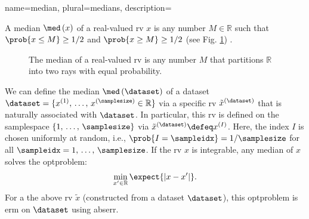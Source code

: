 {name={median}, 
plural={medians},
	description={A median $\med\,(x)$ of a real-valued \gls{rv} $x$ 
 		is any number $M \in \mathbb{R}$ such that $\prob{ x \leq M} \geq 1/2$ and 
		$\prob{ x \geq M} \geq 1/2$ 
		(see Fig. \ref{fig_median1_dict}) \cite{LC}. 
 		\begin{figure}[H]
			\begin{center}
			\end{center}
			\caption{The median of a real-valued \gls{rv} is any number $M$ 
			that partitions $\mathbb{R}$ into two rays with equal \gls{probability}. \label{fig_median1_dict}}
 		\end{figure}  
 		We can define the median $\med\,(\dataset)$ 
 		of a \gls{dataset} $\dataset = \{ x^{(1)}, \,\ldots, \,x^{(\samplesize)} \in \mathbb{R} \}$ 
 		via a specific \gls{rv} $\tilde{x}^{(\dataset)}$ that is naturally associated with $\dataset$. 
 		In particular, this \gls{rv} is defined on the \gls{samplespace} $\{1, \,\ldots, \,\samplesize\}$ 
		via $\tilde{x}^{(\dataset)} \defeq x^{(I)}$. Here, the index $I$ is chosen uniformly 
		at random, i.e., $\prob{I = \sampleidx}=1/\samplesize$ for 
 		all $\sampleidx=1, \,\ldots, \,\samplesize$. If the \gls{rv} $x$ is integrable, any 
		median of $x$ solves the \gls{optproblem}: 
 		$$\min_{x' \in \mathbb{R}} \expect{|x - x'|}.$$ 
		For a the above \gls{rv} $\tilde{x}$ (constructed from a \gls{dataset} $\dataset$), 
		this \gls{optproblem} is \gls{erm} on $\dataset$ using \gls{abserr}. 
}}
